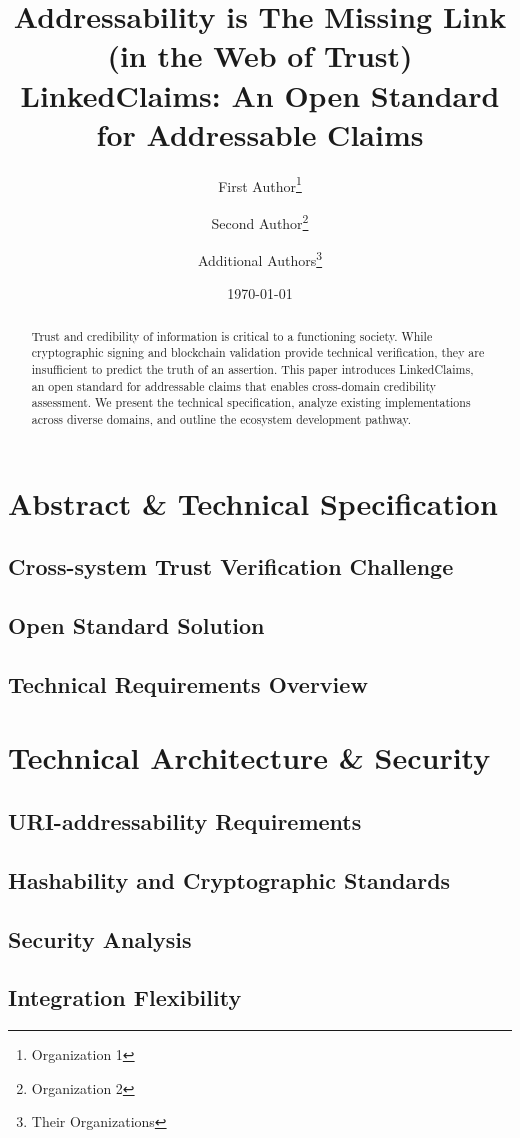 \documentclass[11pt]{article}
\title{Addressability is The Missing Link (in the Web of Trust)\\[0.5em]\Large LinkedClaims: An Open Standard for Addressable Claims}
\author{
    First Author\thanks{Organization 1} \and
    Second Author\thanks{Organization 2} \and
    Additional Authors\thanks{Their Organizations}
}
\date{\today}
\begin{document}
\maketitle

\begin{abstract}
Trust and credibility of information is critical to a functioning society. While cryptographic signing and blockchain validation provide technical verification, they are insufficient to predict the truth of an assertion. This paper introduces LinkedClaims, an open standard for addressable claims that enables cross-domain credibility assessment. We present the technical specification, analyze existing implementations across diverse domains, and outline the ecosystem development pathway.
\end{abstract}

\section{Abstract \& Technical Specification}
\subsection{Cross-system Trust Verification Challenge}
\subsection{Open Standard Solution}
\subsection{Technical Requirements Overview}

\section{Technical Architecture \& Security}
\subsection{URI-addressability Requirements}
\subsection{Hashability and Cryptographic Standards}
\subsection{Security Analysis}
\subsection{Integration Flexibility}
\end{document}
